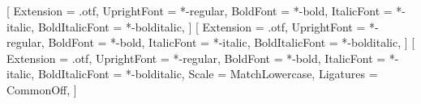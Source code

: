 \newcommand\setFontTimes{%
    \setmainfont{Times New Roman}%
    \setsansfont{Arial}%
    \ifstrequal{\fontsystemVal}{mac}{
        \setmonofont{Menlo}[Scale = MatchLowercase]%
    }{
        \setmonofont{Courier New}[Scale = MatchLowercase]%
    }
}
\newcommand\setTexGyreSansMono{%
    \setsansfont{texgyreheros}[
        Extension      = .otf, %
        UprightFont    = *-regular,
        BoldFont       = *-bold,
        ItalicFont     = *-italic,
        BoldItalicFont = *-bolditalic,
    ]%
    \setmonofont{texgyrecursor}[
        Extension      = .otf, %
        UprightFont    = *-regular,
        BoldFont       = *-bold,
        ItalicFont     = *-italic,
        BoldItalicFont = *-bolditalic,
        Scale          = MatchLowercase,
        Ligatures      = CommonOff,
    ]%
}
\newcommand\setFontTermes{%
    \setmainfont{texgyretermes}[
        Extension      = .otf, %
        UprightFont    = *-regular,
        BoldFont       = *-bold,
        ItalicFont     = *-italic,
        BoldItalicFont = *-bolditalic,
    ]%
    \setTexGyreSansMono
}

\ifstrequal{\fontsystemVal}{windows}{
    \setkeys{configs}{enfont = times}%
    \newcommand\setENfont{\setFontTimes}
}{
    \ifstrequal{\fontsystemVal}{mac}{
        \setkeys{configs}{enfont = times}%
        \newcommand\setENfont{\setFontTimes}
    }{
        \newcommand\setENfont{\setFontTermes}
    }
}
\setENfont


